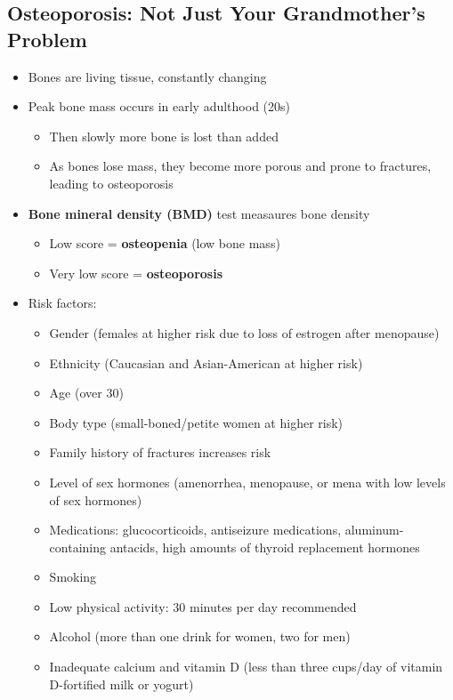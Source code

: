 \documentclass[12pt]{article}
\begin{document}
        \subsection{Osteoporosis: Not Just Your Grandmother's Problem}
            \begin{itemize}
                \item Bones are living tissue, constantly changing
                \item Peak bone mass occurs in early adulthood (20s)
                    \begin{itemize}
                        \item Then slowly more bone is lost than added
                        \item As bones lose mass, they become more porous and prone to fractures, leading to osteoporosis
                    \end{itemize}
                \item \textbf{Bone mineral density (BMD)} test measaures bone density
                    \begin{itemize}
                        \item Low score = \textbf{osteopenia} (low bone mass)
                        \item Very low score = \textbf{osteoporosis}
                    \end{itemize}
                \item Risk factors:
                    \begin{itemize}
                        \item Gender (females at higher risk due to loss of estrogen after menopause)
                        \item Ethnicity (Caucasian and Asian-American at higher risk)
                        \item Age (over 30)
                        \item Body type (small-boned/petite women at higher risk)
                        \item Family history of fractures increases risk
                        \item Level of sex hormones (amenorrhea, menopause, or mena with low levels of sex hormones)
                        \item Medications: glucocorticoids, antiseizure medications, aluminum-containing antacids, high amounts of thyroid replacement hormones
                        \item Smoking
                        \item Low physical activity: 30 minutes per day recommended
                        \item Alcohol (more than one drink for women, two for men)
                        \item Inadequate calcium and vitamin D (less than three cups/day of vitamin D-fortified milk or yogurt)
                    \end{itemize}
            \end{itemize}
\end{document}
